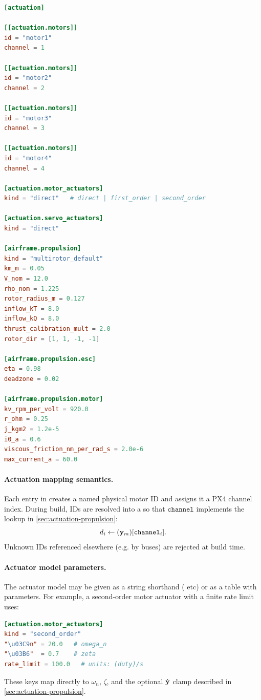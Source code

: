 \begin{lstlisting}[language=toml]
[actuation]

[[actuation.motors]]
id = "motor1"
channel = 1

[[actuation.motors]]
id = "motor2"
channel = 2

[[actuation.motors]]
id = "motor3"
channel = 3

[[actuation.motors]]
id = "motor4"
channel = 4

[actuation.motor_actuators]
kind = "direct"   # direct | first_order | second_order

[actuation.servo_actuators]
kind = "direct"

[airframe.propulsion]
kind = "multirotor_default"
km_m = 0.05
V_nom = 12.0
rho_nom = 1.225
rotor_radius_m = 0.127
inflow_kT = 8.0
inflow_kQ = 8.0
thrust_calibration_mult = 2.0
rotor_dir = [1, 1, -1, -1]

[airframe.propulsion.esc]
eta = 0.98
deadzone = 0.02

[airframe.propulsion.motor]
kv_rpm_per_volt = 920.0
r_ohm = 0.25
j_kgm2 = 1.2e-5
i0_a = 0.6
viscous_friction_nm_per_rad_s = 2.0e-6
max_current_a = 60.0
\end{lstlisting}

\paragraph{Actuation mapping semantics.}
Each entry in  creates a named physical motor ID and assigns it a PX4 channel index. During build, IDs are resolved into a  so that \(\texttt{channel}\) implements the lookup in \cref{sec:actuation-propulsion}:
\[
  d_i \leftarrow (\mathbf{y}_m)[\texttt{channel}_i].
\]
Unknown IDs referenced elsewhere (e.g. by buses) are rejected at build time.

\paragraph{Actuator model parameters.}
The actuator model may be given as a string shorthand ( etc) or as a table with parameters. For example, a second-order motor actuator with a finite rate limit uses:
\begin{lstlisting}[language=toml]
[actuation.motor_actuators]
kind = "second_order"
"\u03C9n" = 20.0   # omega_n
"\u03B6"  = 0.7    # zeta
rate_limit = 100.0   # units: (duty)/s
\end{lstlisting}
These keys map directly to \(\omega_n\), \(\zeta\), and the optional \(\dot{\mathbf{y}}\) clamp described in \cref{sec:actuation-propulsion}.

